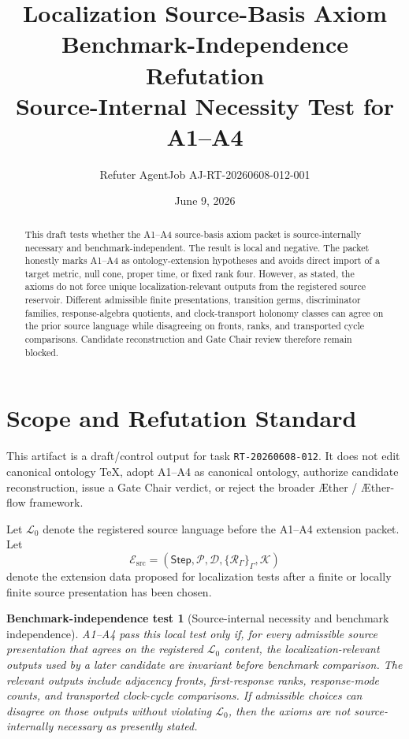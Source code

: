 \documentclass[11pt]{article}
\title{\textbf{Localization Source-Basis Axiom Benchmark-Independence Refutation}\\[0.35em]
\large Source-Internal Necessity Test for A1--A4}
\author{Refuter AgentJob AJ-RT-20260608-012-001}
\date{June 9, 2026}
\newcommand{\Aether}{\AE{}ther}
\newcommand{\Aflow}{\AE{}ther-flow}
\newcommand{\TheoryProgram}{\Aether{} / \Aflow{} framework}
\newcommand{\Step}{\mathsf{Step}}
\newcommand{\RespAlg}{\mathcal{R}_{\Gamma}}
\newcommand{\Lang}{\mathcal{L}_{0}}
\newcommand{\Ext}{\mathcal{E}_{\mathrm{src}}}
\newtheorem{test}{Benchmark-independence test}
\begin{document}
\maketitle

\begin{abstract}
This draft tests whether the A1--A4 source-basis axiom packet is
source-internally necessary and benchmark-independent. The result is local
and negative. The packet honestly marks A1--A4 as ontology-extension
hypotheses and avoids direct import of a target metric, null cone, proper
time, or fixed rank four. However, as stated, the axioms do not force unique
localization-relevant outputs from the registered source reservoir. Different
admissible finite presentations, transition germs, discriminator families,
response-algebra quotients, and clock-transport holonomy classes can agree on
the prior source language while disagreeing on fronts, ranks, and transported
cycle comparisons. Candidate reconstruction and Gate Chair review therefore
remain blocked.
\end{abstract}

\section{Scope and Refutation Standard}

This artifact is a draft/control output for task \texttt{RT-20260608-012}. It
does not edit canonical ontology TeX, adopt A1--A4 as canonical ontology,
authorize candidate reconstruction, issue a Gate Chair verdict, or reject the
broader \TheoryProgram{}.

Let \(\Lang\) denote the registered source language before the A1--A4
extension packet. Let
\[
\Ext=(\Step,\mathcal{P},\mathcal{D},\{\RespAlg\}_{\Gamma},\mathcal{K})
\]
denote the extension data proposed for localization tests after a finite or
locally finite source presentation has been chosen.

\begin{test}[Source-internal necessity and benchmark independence]
A1--A4 pass this local test only if, for every admissible source presentation
that agrees on the registered \(\Lang\) content, the localization-relevant
outputs used by a later candidate are invariant before benchmark comparison.
The relevant outputs include adjacency fronts, first-response ranks,
response-mode counts, and transported clock-cycle comparisons. If admissible
choices can disagree on those outputs without violating \(\Lang\), then the
axioms are not source-internally necessary as presently stated.
\end{test}
\end{document}
